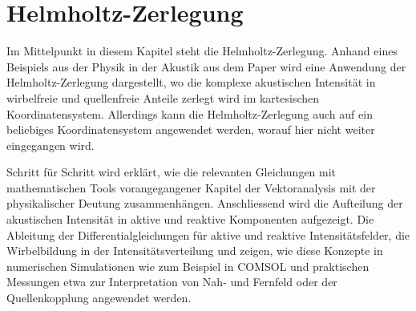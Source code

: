 %
%
%
%
\chapter{Helmholtz-Zerlegung\label{chapter:helmholtz}}
\begin{refsection}

Im Mittelpunkt in diesem Kapitel steht die Helmholtz-Zerlegung.
Anhand eines Beispiels aus der Physik in der Akustik aus dem Paper
\cite{helmholtz:paper}
wird eine Anwendung der Helmholtz-Zerlegung
dargestellt, wo die komplexe akustischen Intensität in wirbelfreie
und quellenfreie Anteile zerlegt wird im kartesischen Koordinatensystem.
Allerdings kann die Helmholtz-Zerlegung auch auf ein beliebiges
Koordinatensystem angewendet werden, worauf hier nicht weiter
eingegangen wird. \newline


Schritt für Schritt wird erklärt, wie die relevanten Gleichungen mit mathematischen Tools vorangegangener Kapitel der Vektoranalysis mit der physikalischer Deutung zusammenhängen. Anschliessend wird die Aufteilung der akustischen Intensität in aktive und reaktive Komponenten aufgezeigt. Die Ableitung der Differentialgleichungen für aktive und reaktive Intensitätsfelder, die Wirbelbildung in der Intensitätsverteilung und zeigen, wie diese Konzepte in numerischen Simulationen wie zum Beispiel in COMSOL und praktischen Messungen etwa zur Interpretation von Nah- und Fernfeld oder der Quellenkopplung angewendet werden.



%
%
%







\printbibliography[heading=subbibliography]
\end{refsection}
